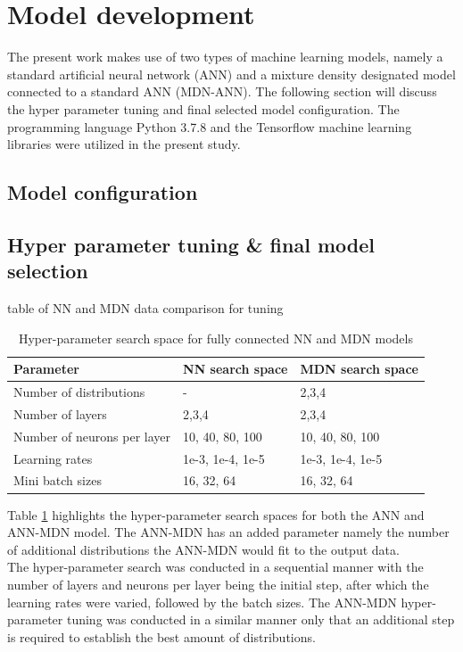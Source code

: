 \documentclass[a4paper,fleqn]{cas-sc}
\begin{document}
\section{Model development}
The present work makes use of two types of machine learning models, namely a standard artificial neural network (ANN) and a mixture density designated model connected to a standard ANN (MDN-ANN). The following section will discuss the hyper parameter tuning and final selected model configuration. The programming language Python 3.7.8 and the Tensorflow machine learning libraries were utilized in the present study. 
\subsection{Model configuration}


\subsection{Hyper parameter tuning \& final model selection}

table of NN and MDN data comparison for tuning

\clearpage
\begin{table}[h!]
\caption{Hyper-parameter search space for fully connected NN and MDN models}\label{tbl_tuning}
\begin{tabular*}{\tblwidth}{p{}p{}p{}}
\toprule
 Parameter& NN search space & MDN search space \\ %
\midrule
 Number of distributions & - & 2,3,4  \\
 Number of layers & 2,3,4 & 2,3,4\\
 Number of neurons per layer & 10, 40, 80, 100  & 10, 40, 80, 100\\
 Learning rates & 1e-3, 1e-4, 1e-5 &  1e-3, 1e-4, 1e-5   \\
 Mini batch sizes  & 16, 32, 64 & 16, 32, 64  \\
\bottomrule
\end{tabular*}
\end{table}
Table \ref{tbl_tuning} highlights the hyper-parameter search spaces for both the ANN and ANN-MDN model. The ANN-MDN has an added parameter namely the number of additional distributions the ANN-MDN would fit to the output data. \\

The hyper-parameter search was conducted in a sequential manner with the number of layers and neurons per layer being the initial step, after which the learning rates were varied, followed by the batch sizes. The ANN-MDN hyper-parameter tuning was conducted in a similar manner only that an additional step is required to establish the best amount of distributions.
\end{document}
